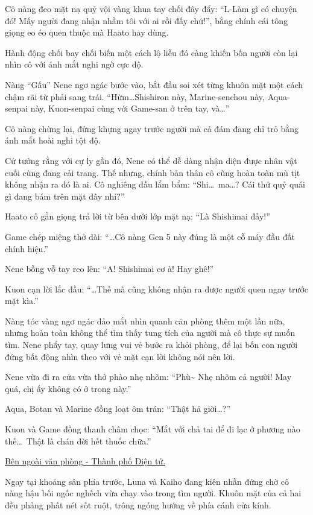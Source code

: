 \documentclass[../main.tex]{subfiles}
\begin{document}
Cô nàng đeo mặt nạ quỷ vội vàng khua tay chối đây đẩy: ``L-Làm gì có chuyện đó! Mấy người đang nhận nhầm tôi với ai rồi đấy chứ!'', bằng chính cái tông giọng eo éo quen thuộc mà Haato hay dùng.

Hành động chối bay chối biến một cách lộ liễu đó càng khiến bốn người còn lại nhìn cô với ánh mắt nghi ngờ cực độ.

Nàng ``Gấu'' Nene ngơ ngác bước vào, bắt đầu soi xét từng khuôn mặt một cách chậm rãi từ phải sang trái. ``Hừm\dots Shishiron này, Marine-senchou này, Aqua-senpai này, Kuon-senpai cùng với Game-san ở trên tay, và\dots''

Cô nàng chừng lại, đứng khựng ngay trước người mà cả đám đang chỉ trỏ bằng ánh mắt hoài nghi tột độ.

Cứ tưởng rằng với cự ly gần đó, Nene có thể dễ dàng nhận diện được nhân vật cuối cùng đang cải trang. Thế nhưng, chính bản thân cô cũng hoàn toàn mù tịt không nhận ra đó là ai. Cô nghiêng đầu lẩm bẩm: ``Shi\dots\ ma\dots? Cái thứ quỷ quái gì đang bám trên mặt đây nhỉ?''

Haato cố gằn giọng trả lời từ bên dưới lớp mặt nạ: ``Là Shishimai đấy!''

Game chép miệng thở dài: ``\dots Cô nàng Gen 5 này đúng là một cỗ máy đầu đất chính hiệu.''

Nene bỗng vỗ tay reo lên: ``A! Shishimai cơ à! Hay ghê!''

Kuon cạn lời lắc đầu: ``\dots Thế mà cũng không nhận ra được người quen ngay trước mặt kìa.''

Nàng tóc vàng ngơ ngác đảo mắt nhìn quanh căn phòng thêm một lần nữa, nhưng hoàn toàn không thể tìm thấy tung tích của người mà cô thực sự muốn tìm. Nene phẩy tay, quay lưng vui vẻ bước ra khỏi phòng, để lại bốn con người đứng bất động nhìn theo với vẻ mặt cạn lời không nói nên lời.

Nene vừa đi ra cửa vừa thở phào nhẹ nhõm: ``Phù\~{} Nhẹ nhõm cả người! May quá, chị ấy không có ở trong này.''

Aqua, Botan và Marine đồng loạt ôm trán: ``Thật hả giời\dots?''

Kuon và Game đồng thanh châm chọc: ``Mắt với chả tai để đi lạc ở phương nào thế\dots\ Thật là chán đời hết thuốc chữa.''

\begin{center}
    \uline{Bên ngoài văn phòng - Thành phố Điện tử.}
\end{center}

Ngay tại khoảng sân phía trước, Luna và Kaiho đang kiên nhẫn đứng chờ cô nàng hậu bối ngốc nghếch vừa chạy vào trong tìm người. Khuôn mặt của cả hai đều phảng phất nét sốt ruột, trông ngóng hướng về phía cánh cửa kính.
\end{document}
